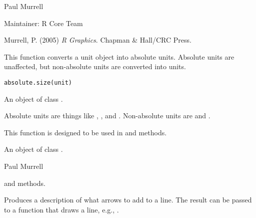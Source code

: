 %
\begin{Author}\relax

Paul Murrell 

Maintainer: R Core Team 

\end{Author}
%
\begin{References}\relax
Murrell, P. (2005) \emph{R Graphics}. Chapman \& Hall/CRC Press.
\end{References}
%
\begin{Description}\relax
This function converts a unit object into absolute units.
Absolute units are unaffected, but non-absolute units are
converted into  units.
\end{Description}
%
\begin{Usage}
\begin{verbatim}
absolute.size(unit)
\end{verbatim}
\end{Usage}
%
\begin{Arguments}
\begin{ldescription}
\item[\code{unit}]  An object of class . 
\end{ldescription}
\end{Arguments}
%
\begin{Details}\relax
Absolute units are things like , ,
and .  Non-absolute units are 
and .

This function is designed to be used in 
and  methods.
\end{Details}
%
\begin{Value}
An object of class .
\end{Value}
%
\begin{Author}\relax
 Paul Murrell 
\end{Author}
%
\begin{SeeAlso}\relax
{}
and  methods.
\end{SeeAlso}
%
\begin{Description}\relax
Produces a description of what arrows to add to a line.
The result can be passed to a function that draws a line,
e.g., .
\end{Description}
